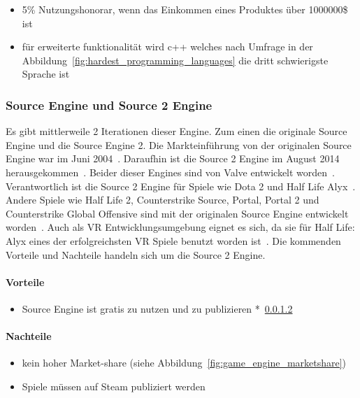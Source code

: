 \begin{itemize}
    \item 5\% Nutzungshonorar, wenn das Einkommen eines Produktes über 1000000\$ ist~\cite{UNREAL_ENGINE_PRICING_2022}
    \item für erweiterte funktionalität wird c++ welches nach Umfrage in der Abbildung~\ref{fig:hardest_programming_languages} die dritt schwierigste Sprache ist
\end{itemize}

\subsubsection{Source Engine und Source 2 Engine}

Es gibt mittlerweile 2 Iterationen dieser Engine.
Zum einen die originale Source Engine und die Source Engine 2.
Die Markteinführung von der originalen Source Engine war im Juni 2004~\cite{Bryan_Wirtz_SOURCE_ENGINE_2022}.
Daraufhin ist die Source 2 Engine im August 2014 herausgekommen~\cite{VALVE_DEVELOPER_COMMUNITY_SOURCE2}.
Beider dieser Engines sind von Valve entwickelt worden~\cite{VALVE_DEVELOPER_COMMUNITY_SOURCE, VALVE_DEVELOPER_COMMUNITY_SOURCE2}.
Verantwortlich ist die Source 2 Engine für Spiele wie Dota 2 und Half Life Alyx~\cite{WIKIPEDIA_SOURCE2_ENGINE_GAME_LIST}.
Andere Spiele wie Half Life 2, Counterstrike Source, Portal, Portal 2 und Counterstrike Global Offensive sind mit der originalen Source Engine entwickelt worden~\cite{WIKIPEDIA_SOURCE_ENGINE_GAME_LIST}.
Auch als VR Entwicklungsumgebung eignet es sich, da sie für Half Life: Alyx eines der erfolgreichsten VR Spiele benutzt worden ist~\cite{WIKIPEDIA_SOURCE2_ENGINE_GAME_LIST, Aden_Carter_2020}.
Die kommenden Vorteile und Nachteile handeln sich um die Source 2 Engine.

\paragraph{Vorteile}

\begin{itemize}
    \item Source Engine ist gratis zu nutzen und zu publizieren *~\ref{pgr:cons}
\end{itemize}


\paragraph{Nachteile}\label{pgr:cons}

\begin{itemize}
    \item kein hoher Market-share (siehe Abbildung~\ref{fig:game_engine_marketshare})
    \item Spiele müssen auf Steam publiziert werden~\cite{Brenna_Hillier_2015}
\end{itemize}



